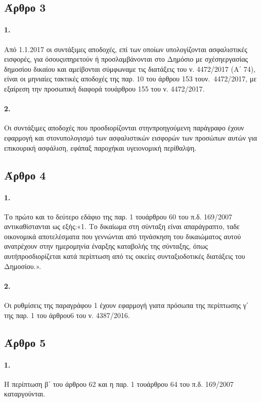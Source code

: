 \documentclass[a4paper,oneside, 10pt]{book}
\begin{document}
\subsection*{ Άρθρο 3 }
\paragraph { 1. } Από 1.1.2017 οι συντάξιμες αποδοχές, επί των οποίων υπολογίζονται ασφαλιστικές εισφορές, για όσουςυπηρετούν ή προσλαμβάνονται στο Δημόσιο με σχέσηεργασίας δημοσίου δικαίου και αμείβονται σύμφωναμε τις διατάξεις του ν. 4472/2017 (Α΄ 74), είναι οι μηνιαίες τακτικές αποδοχές της παρ. 10 του άρθρου 153 τουν. 4472/2017, με εξαίρεση την προσωπική διαφορά τουάρθρου 155 του ν. 4472/2017.
\paragraph { 2. } Οι συντάξιμες αποδοχές που προσδιορίζονται στηνπροηγούμενη παράγραφο έχουν εφαρμογή και στονυπολογισμό των ασφαλιστικών εισφορών των προσώπων αυτών για επικουρική ασφάλιση, εφάπαξ παροχήκαι υγειονομική περίθαλψη.
\subsection*{ Άρθρο 4 }
\paragraph { 1. } Το πρώτο και το δεύτερο εδάφιο της παρ. 1 τουάρθρου 60 του π.δ. 169/2007 αντικαθίστανται ως εξής:«1. Το δικαίωμα στη σύνταξη είναι απαράγραπτο, ταδε οικονομικά αποτελέσματα που γεννώνται από τηνάσκηση του δικαιώματος αυτού ανατρέχουν στην ημερομηνία έναρξης καταβολής της σύνταξης, όπως αυτήπροσδιορίζεται κατά περίπτωση από τις οικείες συνταξιοδοτικές διατάξεις του Δημοσίου.».
\paragraph { 2. } Οι ρυθμίσεις της παραγράφου 1 έχουν εφαρμογή γιατα πρόσωπα της περίπτωσης γ΄ της παρ. 1 του άρθρου6 του ν. 4387/2016.
\subsection*{ Άρθρο 5 }
\paragraph { 1. } Η περίπτωση β΄ του άρθρου 62 και η παρ. 1 τουάρθρου 64 του π.δ. 169/2007 καταργούνται.
\end{document}
